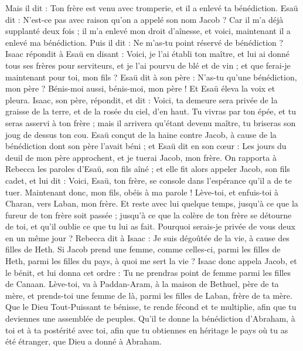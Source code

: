 \begin{multicols}{2}
Mais il dit : Ton frère est venu avec tromperie, et il a enlevé ta bénédiction.
Esaü dit : N'est-ce pas avec raison qu'on a appelé son nom Jacob ? Car il m'a déjà supplanté deux fois ; il m'a enlevé mon droit d'aînesse, et voici, maintenant il a enlevé ma bénédiction. Puis il dit : Ne m'as-tu point réservé de bénédiction ?
Isaac répondit à Esaü en disant : Voici, je l'ai établi ton maître, et lui ai donné tous ses frères pour serviteurs, et je l'ai pourvu de blé et de vin ; et que ferai-je maintenant pour toi, mon fils ?
Esaü dit à son père : N'as-tu qu'une bénédiction, mon père ? Bénis-moi aussi, bénis-moi, mon père ! Et Esaü éleva la voix et pleura.
Isaac, son père, répondit, et dit : Voici, ta demeure sera privée de la graisse de la terre, et de la rosée du ciel, d'en haut.
Tu vivras par ton épée, et tu seras asservi à ton frère ; mais il arrivera qu'étant devenu maître, tu briseras son joug de dessus ton cou.
Esaü conçut de la haine contre Jacob, à cause de la bénédiction dont son père l'avait béni ; et Esaü dit en son cœur : Les jours du deuil de mon père approchent, et je tuerai Jacob, mon frère.
On rapporta à Rebecca les paroles d'Esaü, son fils aîné ; et elle fit alors appeler Jacob, son fils cadet, et lui dit : Voici, Esaü, ton frère, se console dans l'espérance qu'il a de te tuer.
Maintenant donc, mon fils, obéis à ma parole ! Lève-toi, et enfuis-toi à Charan, vers Laban, mon frère.
Et reste avec lui quelque temps, jusqu'à ce que la fureur de ton frère soit passée ;
jusqu'à ce que la colère de ton frère se détourne de toi, et qu'il oublie ce que tu lui as fait. Pourquoi serais-je privée de vous deux en un même jour ?
Rebecca dit à Isaac : Je suis dégoûtée de la vie, à cause des filles de Heth. Si Jacob prend une femme, comme celles-ci, parmi les filles de Heth, parmi les filles du pays, à quoi me sert la vie ?
\VerseOne{}Isaac donc appela Jacob, et le bénit, et lui donna cet ordre : Tu ne prendras point de femme parmi les filles de Canaan.
Lève-toi, va à Paddan-Aram, à la maison de Bethuel, père de ta mère, et prends-toi une femme de là, parmi les filles de Laban, frère de ta mère.
Que le Dieu Tout-Puissant te bénisse, te rende fécond et te multiplie, afin que tu deviennes une assemblée de peuples.
Qu'il te donne la bénédiction d'Abraham, à toi et à ta postérité avec toi, afin que tu obtiennes en héritage le pays où tu as été étranger, que Dieu a donné à Abraham.

\end{multicols}
